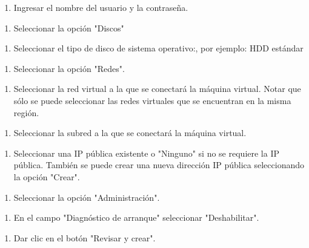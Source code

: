 \begin{enumerate}
\item Ingresar el nombre del usuario y la contraseña.
\end{enumerate}

\begin{enumerate}
\item Seleccionar la opción "Discos"
\end{enumerate}

\begin{enumerate}
\item Seleccionar el tipo de disco de sistema operativo:, por ejemplo: HDD estándar
\end{enumerate}

\begin{enumerate}
\item Seleccionar la opción "Redes".
\end{enumerate}

\begin{enumerate}
\item Seleccionar la red virtual a la que se conectará la máquina virtual. Notar que sólo se puede seleccionar las redes virtuales que se encuentran en la misma región.
\end{enumerate}

\begin{enumerate}
\item Seleccionar la subred a la que se conectará la máquina virtual.
\end{enumerate}

\begin{enumerate}
\item Seleccionar una IP pública existente o "Ninguno" si no se requiere la IP pública. También se puede crear una nueva dirección IP pública seleccionando la opción "Crear".
\end{enumerate}

\begin{enumerate}
\item Seleccionar la opción "Administración".
\end{enumerate}

\begin{enumerate}
\item En el campo "Diagnóstico de arranque" seleccionar "Deshabilitar".
\end{enumerate}

\begin{enumerate}
\item Dar clic en el botón "Revisar y crear".
\end{enumerate}

